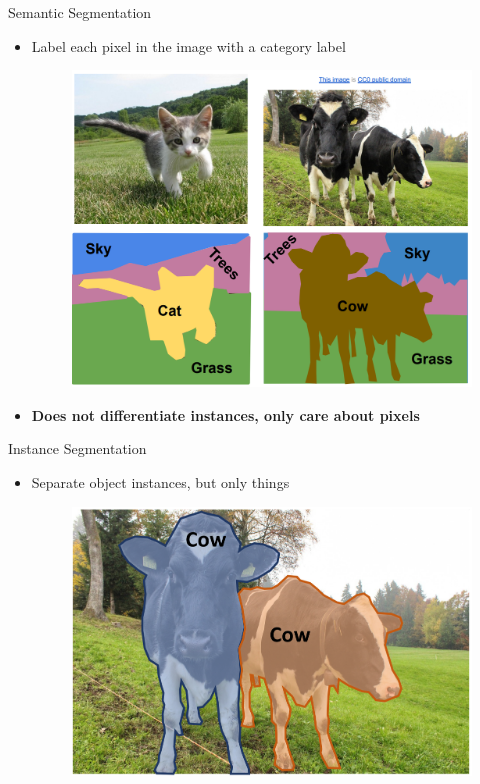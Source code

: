 \documentclass[10pt]{beamer}
\theoremstyle{remark}
\theoremstyle{definition}
\begin{document}
\begin{frame}{Semantic Segmentation}
\begin{itemize}
    \item Label each pixel in the image with a category label
    \begin{figure}
    \centering
    \includegraphics[width=1.0\textwidth,height=0.7\textheight,keepaspectratio]{./images/sem_12.png}
    \end{figure}
    \pause
    \item \textbf{Does not differentiate instances, only care about pixels}
\end{itemize}
    
\end{frame}

\begin{frame}{Instance Segmentation}
\begin{itemize}
    \item Separate object instances, but only things
    \begin{figure}
    \centering
    \includegraphics[width=1.0\textwidth,height=0.7\textheight,keepaspectratio]{./images/ins_4.png}
    \end{figure}
\end{itemize}
    
\end{frame}
\end{document}
